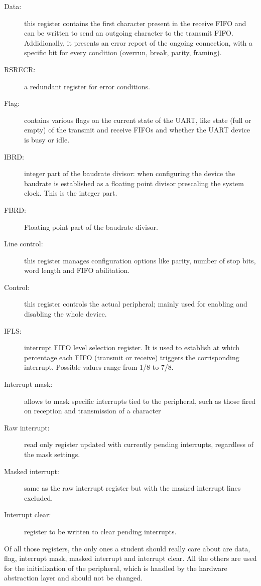\documentclass[12pt,a4paper,openright,twoside]{report}
\begin{document}
\begin{description}
    \item[Data:] this register contains the first character present in 
            the receive FIFO and can be written to send an outgoing character to 
            the transmit FIFO. Addidionally, it presents an error report of the ongoing
            connection, with a specific bit for every condition (overrun, break,
            parity, framing).
    \item[RSRECR:] a redundant register for error conditions.
    \item[Flag:] contains various flags on the current state of the UART, like 
            state (full or empty) of the transmit and receive FIFOs and whether
            the UART device is busy or idle.
    \item[IBRD:] integer part of the baudrate divisor: when configuring the device
            the baudrate is established as a floating point divisor prescaling
            the system clock. This is the integer part.
    \item[FBRD:] Floating point part of the baudrate divisor.
    \item[Line control:] this register manages configuration options like
            parity, number of stop bits, word length and FIFO abilitation.
    \item[Control:] this register controls the actual peripheral; mainly used
            for enabling and disabling the whole device.
    \item[IFLS:] interrupt FIFO level selection register. It is used to establish 
            at which percentage each FIFO (transmit or receive) triggers the
            corrisponding interrupt. Possible values range from 1/8 to 7/8.
    \item[Interrupt mask:] allows to mask specific interrupts tied to the peripheral,
            such as those fired on reception and transmission of a character
    \item[Raw interrupt:] read only register updated with currently pending
            interrupts, regardless of the mask settings.
    \item[Masked interrupt:] same as the raw interrupt register but with the
            masked interrupt lines excluded.
    \item[Interrupt clear:] register to be written to clear pending interrupts.
\end{description}

Of all those registers, the only ones a student should really care about are
data, flag, interrupt mask, masked interrupt and interrupt clear. All the others 
are used for the initialization of the peripheral, which is handled by the 
hardware abstraction layer and should not be changed.
\end{document}
